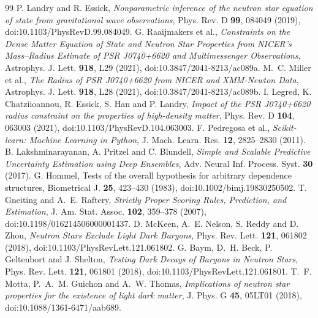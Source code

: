 \documentclass[11pt,a4paper]{article}
\begin{document}
\begin{thebibliography}{99}\small
{} P. Landry and R. Essick, \emph{Nonparametric inference of the neutron star equation of state from gravitational wave observations}, Phys. Rev. D \textbf{99}, 084049 (2019), doi:10.1103/PhysRevD.99.084049.
 G. Raaijmakers et al., \emph{Constraints on the Dense Matter Equation of State and Neutron Star Properties from NICER's Mass--Radius Estimate of PSR J0740+6620 and Multimessenger Observations}, Astrophys. J. Lett. \textbf{918}, L29 (2021), doi:10.3847/2041-8213/ac089a.
 M.~C. Miller et al., \emph{The Radius of PSR J0740+6620 from NICER and XMM-Newton Data}, Astrophys. J. Lett. \textbf{918}, L28 (2021), doi:10.3847/2041-8213/ac089b.
 I. Legred, K. Chatziioannou, R. Essick, S. Han and P. Landry, \emph{Impact of the PSR J0740+6620 radius constraint on the properties of high-density matter}, Phys. Rev. D \textbf{104}, 063003 (2021), doi:10.1103/PhysRevD.104.063003.
 F. Pedregosa et al., \emph{Scikit-learn: Machine Learning in Python}, J. Mach. Learn. Res. \textbf{12}, 2825--2830 (2011).
 B. Lakshminarayanan, A. Pritzel and C. Blundell, \emph{Simple and Scalable Predictive Uncertainty Estimation using Deep Ensembles}, Adv. Neural Inf. Process. Syst. \textbf{30} (2017).
 G. Hommel, Tests of the overall hypothesis for arbitrary dependence structures, Biometrical J. \textbf{25}, 423--430 (1983), doi:10.1002/bimj.19830250502.
 T. Gneiting and A.~E. Raftery, \emph{Strictly Proper Scoring Rules, Prediction, and Estimation}, J. Am. Stat. Assoc. \textbf{102}, 359--378 (2007), doi:10.1198/016214506000001437.
 D. McKeen, A.~E. Nelson, S. Reddy and D. Zhou, \emph{Neutron Stars Exclude Light Dark Baryons}, Phys. Rev. Lett. \textbf{121}, 061802 (2018), doi:10.1103/PhysRevLett.121.061802.
 G. Baym, D.~H. Beck, P. Geltenbort and J. Shelton, \emph{Testing Dark Decays of Baryons in Neutron Stars}, Phys. Rev. Lett. \textbf{121}, 061801 (2018), doi:10.1103/PhysRevLett.121.061801.
 T.~F. Motta, P.~A.~M. Guichon and A.~W. Thomas, \emph{Implications of neutron star properties for the existence of light dark matter}, J. Phys. G \textbf{45}, 05LT01 (2018), doi:10.1088/1361-6471/aab689.

\end{thebibliography}
\end{document}
